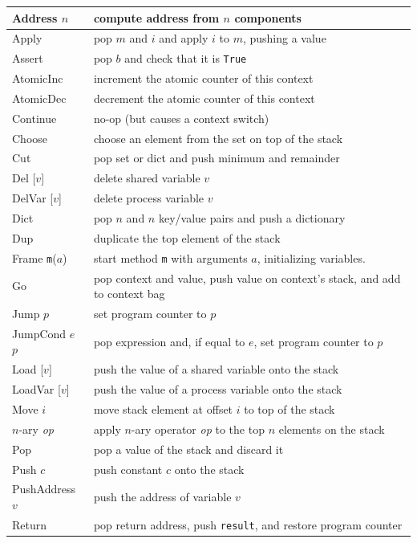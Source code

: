 \documentclass{report}
\begin{document}
{\small
\begin{tabular}{|l|l|}
\hline
Address $n$ & compute address from $n$ components \\
\hline
Apply & pop $m$ and $i$ and apply $i$ to $m$, pushing a value \\
\hline
Assert & pop $b$ and check that it is \texttt{True} \\
\hline
AtomicInc & increment the atomic counter of this context \\
\hline
AtomicDec & decrement the atomic counter of this context \\
\hline
Continue & no-op (but causes a context switch) \\
\hline
Choose & choose an element from the set on top of the stack \\
\hline
Cut & pop set or dict and push minimum and remainder \\
\hline
Del [$v$] & delete shared variable $v$ \\
\hline
DelVar [$v$] & delete process variable $v$ \\
\hline
Dict & pop $n$ and $n$ key/value pairs and push a dictionary \\
\hline
Dup & duplicate the top element of the stack \\
\hline
Frame \texttt{m}($a$) & start method \texttt{m} with arguments $a$,
initializing variables.  \\
\hline
Go & pop context and value, push value on context's stack, and add to context bag \\
\hline
Jump $p$ & set program counter to $p$ \\
\hline
JumpCond $e$ $p$ & pop expression and, if equal to $e$, set program counter to $p$ \\
\hline
Load [$v$] & push the value of a shared variable onto the stack \\
\hline
LoadVar [$v$] & push the value of a process variable onto the stack \\
\hline
Move $i$ & move stack element at offset $i$ to top of the stack \\
\hline
$n$-ary \textit{op} & apply $n$-ary operator \textit{op} to the top $n$ elements on the stack \\
\hline
Pop & pop a value of the stack and discard it \\
\hline
Push $c$ & push constant $c$ onto the stack \\
\hline
PushAddress $v$ & push the address of variable $v$ \\
\hline
Return & pop return address, push \texttt{result}, and restore program counter \\

\end{tabular}}
\end{document}
